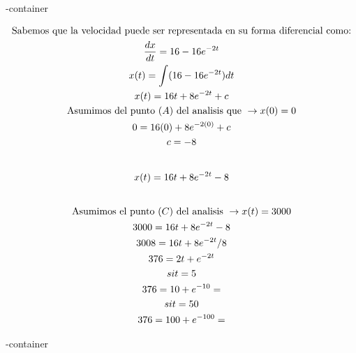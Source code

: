 \documentclass{article}
\begin{document}
\image-container


\begin{gather*}
\text{Sabemos que la velocidad puede ser representada en su forma diferencial como:} \\
\frac{dx}{dt} =16-16e^{-2t} \\
x(t) = \int (16-16e^{-2t})dt \\
x(t) = 16t+8e^{-2t}+c \\
\text{Asumimos del punto }(A)\text{ del analisis que } \rightarrow  x(0) = 0 \\
0 = 16(0)+8e^{-2(0)}+c \\
c = -8 \\
\vspace{0.5em} \\
x(t) = 16t+8e^{-2t}-8 \\
\vspace{0.5em} \\
\text{Asumimos el punto }(C)\text{ del analisis } \rightarrow  x(t) = 3000  \\
3000 = 16t+8e^{-2t}-8 \\
3008=16t+8e^{-2t}  /8 \\
376 = 2t+e^{-2t}  \\
si t = 5 \\
376 = 10+e^{-10} = \\
si t = 50 \\
376 = 100+e^{-100} =
\end{gather*}




\image-container
\end{document}
